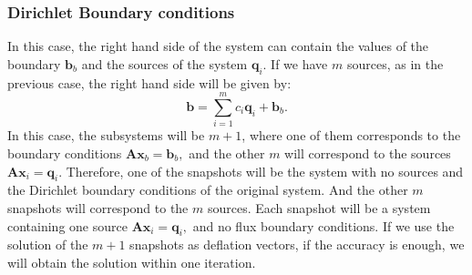 \documentclass[12pt]{article}
\begin{document}
\subsubsection*{{Dirichlet Boundary conditions}}
In this case, the right hand side of the system can contain the values of the boundary $\mathbf{b}_b$ and the sources of the system $\mathbf{q}_i$. 
If we have $m$ sources, as in the previous case, the right hand side will be given by:
$$\mathbf{b}=\sum_{i=1}^m {c}_i\mathbf{q}_i+\mathbf{b}_b.$$
In this case, the subsystems will be $m+1$, where one of them corresponds to the boundary conditions
 $\mathbf{A}\mathbf{x}_b=\mathbf{b}_b,$
 and the other $m$ will correspond to the sources
$\mathbf{A}\mathbf{x}_i=\mathbf{q}_i.$
Therefore, one of the snapshots will be the system with no sources and the Dirichlet boundary conditions of the original system. And the other $m$ snapshots will correspond to the $m$ sources. Each snapshot will be a system containing one source $\mathbf{A}\mathbf{x}_i=\mathbf{q}_i,$ and no flux boundary conditions. 
If we use the solution of the $m+1$ snapshots as deflation vectors, if the accuracy is enough, we will obtain the solution within one iteration.
\end{document}
